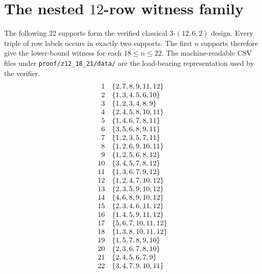 \documentclass[11pt]{amsart}
\begin{document}
\section{The nested $12$-row witness family}
\label{app:12-design}
The following 22 supports form the verified classical 3-$(12,6,2)$ design.
Every triple of row labels occurs in exactly two supports. The first $n$
supports therefore give the lower-bound witness for each $18\le n\le22$.
The machine-readable CSV files under \texttt{proof/z12\_18\_21/data/} are the
load-bearing representation used by the verifier.
\[
\begin{array}{r l}
1&\{2,7,8,9,11,12\}\\
2&\{1,3,4,5,6,10\}\\
3&\{1,2,3,4,8,9\}\\
4&\{2,4,5,8,10,11\}\\
5&\{1,4,6,7,8,11\}\\
6&\{3,5,6,8,9,11\}\\
7&\{1,2,3,5,7,11\}\\
8&\{1,2,6,9,10,11\}\\
9&\{1,2,5,6,8,12\}\\
10&\{3,4,5,7,8,12\}\\
11&\{1,3,6,7,9,12\}\\
12&\{1,2,4,7,10,12\}\\
13&\{2,3,5,9,10,12\}\\
14&\{4,6,8,9,10,12\}\\
15&\{2,3,4,6,11,12\}\\
16&\{1,4,5,9,11,12\}\\
17&\{5,6,7,10,11,12\}\\
18&\{1,3,8,10,11,12\}\\
19&\{1,5,7,8,9,10\}\\
20&\{2,3,6,7,8,10\}\\
21&\{2,4,5,6,7,9\}\\
22&\{3,4,7,9,10,11\}
\end{array}
\]
\end{document}
